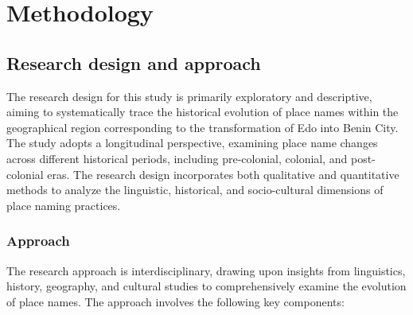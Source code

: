 \chapter{Methodology}
\section{Research design and approach}
The research design for this study is primarily exploratory and descriptive, aiming to systematically trace the historical evolution of place names within the geographical region corresponding to the transformation of Edo into Benin City. The study adopts a longitudinal perspective, examining place name changes across different historical periods, including pre-colonial, colonial, and post-colonial eras. The research design incorporates both qualitative and quantitative methods to analyze the linguistic, historical, and socio-cultural dimensions of place naming practices.
\subsection{Approach}
The research approach is interdisciplinary, drawing upon insights from linguistics, history, geography, and cultural studies to comprehensively examine the evolution of place names. The approach involves the following key components:


